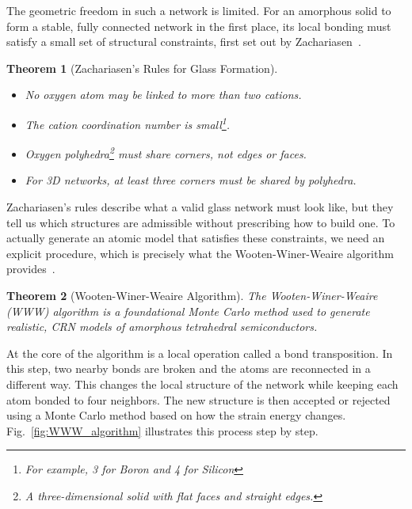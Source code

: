 \documentclass{article}
\newtheorem{theorem}{Theorem}
\begin{document}
The geometric freedom in such a network is limited. For an amorphous solid to form a stable, fully connected network in the first place, its local bonding must satisfy a small set of structural constraints, first set out by Zachariasen~\cite{zachariasen1932}.
\begin{theorem}[Zachariasen's Rules for Glass Formation]
    \leavevmode
    \begin{itemize}
        \item No oxygen atom may be linked to more than two cations.
        \item The cation coordination number is small\footnote{For example, 3 for Boron and 4 for Silicon}.
        \item Oxygen polyhedra\footnote{A three-dimensional solid with flat faces and straight edges.} must share corners, not edges or faces.
        \item For 3D networks, at least three corners must be shared by polyhedra.
    \end{itemize}
\end{theorem}
Zachariasen's rules describe what a valid glass network must look like, but they tell us which structures are admissible without prescribing how to build one. To actually generate an atomic model that satisfies these constraints, we need an explicit procedure, which is precisely what the Wooten-Winer-Weaire algorithm provides~\cite{www1985}.
\begin{theorem}[Wooten-Winer-Weaire Algorithm]
    The Wooten-Winer-Weaire (WWW) algorithm is a foundational Monte Carlo method used to generate realistic, CRN models of amorphous tetrahedral semiconductors.
\end{theorem}
At the core of the algorithm is a local operation called a bond transposition. In this step, two nearby bonds are broken and the atoms are reconnected in a different way. This changes the local structure of the network while keeping each atom bonded to four neighbors. The new structure is then accepted or rejected using a Monte Carlo method based on how the strain energy changes. Fig.~\ref{fig:WWW_algorithm} illustrates this process step by step.
\end{document}
